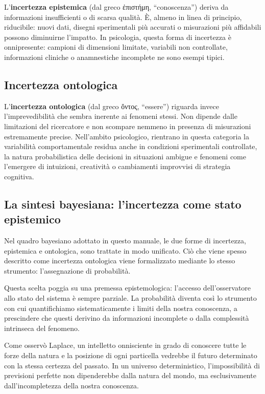 \documentclass[
  italian,
  letterpaper,
  a4paper,
  11pt,
  open=any]{scrbook}
\theoremstyle{plain}
\theoremstyle{definition}
\theoremstyle{definition}
\theoremstyle{remark}
\begin{document}
L'\textbf{incertezza epistemica} (dal greco ἐπιστήμη, ``conoscenza'')
deriva da informazioni insufficienti o di scarsa qualità. È, almeno in
linea di principio, riducibile: nuovi dati, disegni sperimentali più
accurati o misurazioni più affidabili possono diminuirne l'impatto. In
psicologia, questa forma di incertezza è onnipresente: campioni di
dimensioni limitate, variabili non controllate, informazioni cliniche o
anamnestiche incomplete ne sono esempi tipici.

\subsection{Incertezza ontologica}\label{incertezza-ontologica}

L'\textbf{incertezza ontologica} (dal greco ὄντος, ``essere'') riguarda
invece l'imprevedibilità che sembra inerente ai fenomeni stessi. Non
dipende dalle limitazioni del ricercatore e non scompare nemmeno in
presenza di misurazioni estremamente precise. Nell'ambito psicologico,
rientrano in questa categoria la variabilità comportamentale residua
anche in condizioni sperimentali controllate, la natura probabilistica
delle decisioni in situazioni ambigue e fenomeni come l'emergere di
intuizioni, creatività o cambiamenti improvvisi di strategia cognitiva.

\subsection{La sintesi bayesiana: l'incertezza come stato
epistemico}\label{la-sintesi-bayesiana-lincertezza-come-stato-epistemico}

Nel quadro bayesiano adottato in questo manuale, le due forme di
incertezza, epistemica e ontologica, sono trattate in modo unificato.
Ciò che viene spesso descritto come incertezza ontologica viene
formalizzato mediante lo stesso strumento: l'assegnazione di
probabilità.

Questa scelta poggia su una premessa epistemologica: l'accesso
dell'osservatore allo stato del sistema è sempre parziale. La
probabilità diventa così lo strumento con cui quantifichiamo
sistematicamente i limiti della nostra conoscenza, a prescindere che
questi derivino da informazioni incomplete o dalla complessità
intrinseca del fenomeno.

Come osservò Laplace, un intelletto onnisciente in grado di conoscere
tutte le forze della natura e la posizione di ogni particella vedrebbe
il futuro determinato con la stessa certezza del passato. In un universo
deterministico, l'impossibilità di previsioni perfette non dipenderebbe
dalla natura del mondo, ma esclusivamente dall'incompletezza della
nostra conoscenza.
\end{document}
